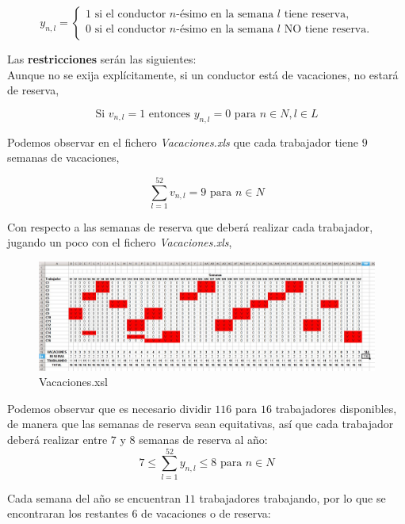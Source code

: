 \documentclass[a4paper,12pt]{article}
\begin{document}
	\begin{equation*}
	y_{n,l} = \left\lbrace \begin{array}{l}
		1 \text{ si el conductor } n\text{-\'esimo en la semana } l \text{  tiene reserva,} \\
		0 \text{ si el conductor } n\text{-\'esimo en la semana } l \text{ NO tiene reserva.} \\
	\end{array}
	\right. 
	\end{equation*}
	
	
Las \textbf{restricciones} ser\'an las siguientes:\\

Aunque no se exija expl\'icitamente, si un conductor est\'a de vacaciones, no estar\'a de reserva,

$$\text{Si } v_{n,l} = 1 \text{ entonces } y_{n,l} = 0 \text{ para } n\in N, l\in L$$

Podemos observar en el fichero \textit{Vacaciones.xls} que cada trabajador tiene $9$ semanas de vacaciones,

$$ \sum_{l=1}^{52} {v_{n,l}} = 9 \text{ para } n\in N$$

Con respecto a las semanas de reserva que deber\'a realizar cada trabajador, jugando un poco con el fichero \textit{Vacaciones.xls},\\

\begin{figure}[h!]
  \centering
	\includegraphics[scale=0.4]{reserva.png}
	  \caption{Vacaciones.xsl}
\end{figure}

Podemos observar que es necesario dividir $116$ para $16$ trabajadores disponibles, de manera que las semanas de reserva sean equitativas, as\'i que cada trabajador deber\'a realizar entre $7$ y $8$ semanas de reserva al a\~no:\\

$$ 7 \leq \sum_{l=1}^{52} {y_{n,l}} \leq 8 \text{ para } n\in N$$

Cada semana del año se encuentran $11$ trabajadores trabajando, por lo que se encontraran los restantes $6$ de vacaciones o de reserva:
\end{document}
